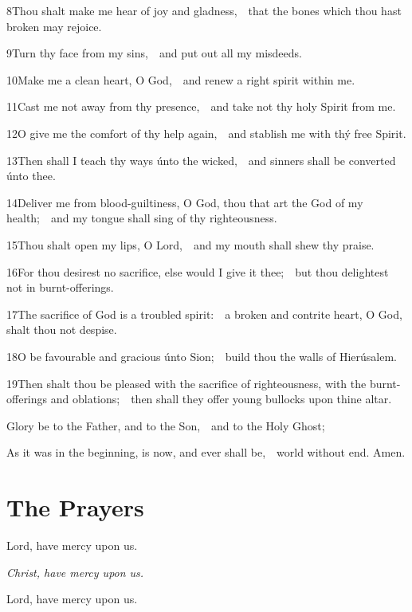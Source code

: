 8\enspace Thou shalt make me hear of joy and gladness,\ \star\ that the bones which thou hast broken may rejoice.

9\enspace Turn thy face from my sins,\ \star\ and put out all my misdeeds.

10\enspace Make me a clean heart, O God,\ \star\ and renew a right spirit within me.

11\enspace Cast me not away from thy presence,\ \star\ and take not thy holy Spirit from me.

12\enspace O give me the comfort of thy help again,\ \star\ and stablish me with thý free Spirit.

13\enspace Then shall I teach thy ways únto the wicked,\ \star\ and sinners shall be converted únto thee.

14\enspace Deliver me from blood-guiltiness, O God, thou that art the God of my health;\ \star\ and my tongue shall sing of thy righteousness.

15\enspace Thou shalt open my lips, O Lord,\ \star\ and my mouth shall shew thy praise.

16\enspace For thou desirest no sacrifice, else would I give it thee;\ \star\ but thou delightest not in burnt-offerings.

17\enspace The sacrifice of God is a troubled spirit:\ \star\ a broken and contrite heart, O God, shalt thou not despise.

18\enspace O be favourable and gracious únto Sion;\ \star\ build thou the walls of Hierúsalem.

19\enspace Then shalt thou be pleased with the sacrifice of righteousness, with the burnt-offerings and oblations;\ \star\ then shall they offer young bullocks upon thine altar.

Glory be to the Father, and to the Son,\ \star\ and to the Holy Ghost;

As it was in the beginning, is now, and ever shall be,\ \star\ world without end. Amen.

\medskip
\section{The Prayers}


\centerline{Lord, have mercy upon us.}
\centerline{\emph{Christ, have mercy upon us.}}
\centerline{Lord, have mercy upon us.}

\smallskip
{}


